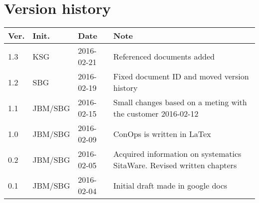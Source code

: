 \chapter*{Version history}
\label{app:rev_his}

\begin{tabular}{b{1cm} b{2cm} b{2cm} b{7cm}}
    \textbf{Ver.} & \textbf{Init.} & \textbf{Date} & \textbf{Note} \\
    \hline 
    1.3  & KSG		& 2016-02-21 & Referenced documents added\\
    1.2  & SBG		& 2016-02-19 & Fixed document ID and moved version history\\
    1.1  & JBM/SBG	& 2016-02-15 & Small changes based on a meting with the customer 2016-02-12\\
    1.0  & JBM/SBG	& 2016-02-09 & ConOps is written in LaTex \\
    0.2  & JBM/SBG	& 2016-02-05 & Acquired information on systematics SitaWare. Revised written chapters \\
    0.1  & JBM/SBG	& 2016-02-04 & Initial draft made in google docs \\
\end{tabular}